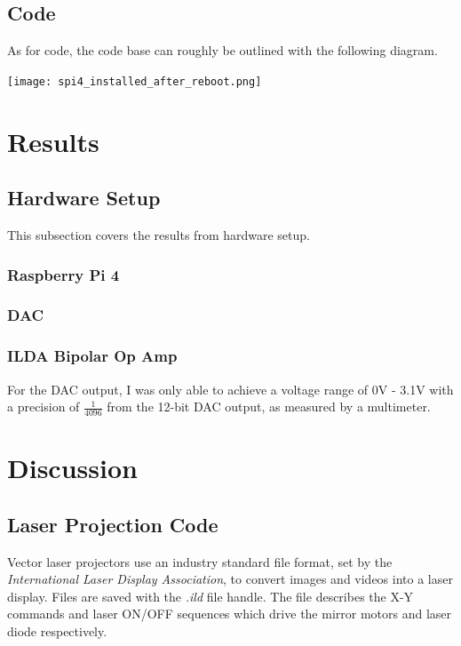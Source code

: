 \documentclass[journal]{IEEEtran}
\begin{document}
    \subsection{Code}

    As for code, the code base can roughly be outlined with the following diagram.

    \texttt{[image: spi4\_installed\_after\_reboot.png]}



    \section{Results}
    \subsection{Hardware Setup}
    This subsection covers the results from hardware setup.

    \subsubsection{Raspberry Pi 4}
    \subsubsection{DAC}
    
    \subsubsection{ILDA Bipolar Op Amp}
    For the DAC output, I was only able to achieve a voltage range of 0V - 3.1V with a precision of $\frac{1}{4096}$ from the 12-bit DAC output, as measured by a multimeter.

    \section{Discussion}
    \subsection{Laser Projection Code}
    Vector laser projectors use an industry standard file format, set by the \emph{International Laser Display Association}, to convert images and videos into a laser display.
    Files are saved with the \emph{.ild} file handle.
    The file describes the X-Y commands and laser ON/OFF sequences which drive the mirror motors and laser diode respectively.
\end{document}

